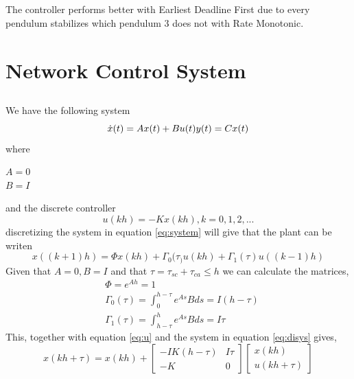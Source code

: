 \documentclass[12pt,a4paper]{article}
\begin{document}
\subsection{}
The controller performs better with Earliest Deadline First due to every
pendulum stabilizes which pendulum 3 does not with Rate Monotonic. 





\section{Network Control System}
\subsection{} %
We have the following system
  \begin{equation}
    \dot{x}(t) = Ax(t)+Bu(t) \\
    y(t) = Cx(t)
    \label{eq:system}
  \end{equation}
where
\begin{center}
$A=0$ \\
$B=I$
\end{center}
and the discrete controller
\begin{equation}
    u(kh) = -Kx(kh),    k = 0,1,2,...
    \label{eq:u}
\end{equation}
discretizing the system in equation \ref{eq:system} will give that the
plant can be writen
\begin{equation}
    x((k+1)h)=\Phi x(kh)+\Gamma_{0}(\tau_)u(kh)+\Gamma_{1}(\tau)u((k-1)h)
    \label{eq:disys}
\end{equation}
Given that $A=0, B=I$ and that $\tau = \tau_{sc}+\tau_{ca}\le h$ we can
calculate the matrices,
\begin{align*}
    &\Phi=e^{Ah}=1 \\
    &\Gamma_{0}(\tau)=\int_{0}^{h-\tau}e^{As}Bds=I(h-\tau) \\
    &\Gamma_{1}(\tau)=\int_{h-\tau}^{h}e^{As}Bds=I\tau
\end{align*}
This, together with equation \ref{eq:u} and the system in equation \ref{eq:disys}
gives,
\begin{equation}
  x(kh+\tau)=x(kh)+
  \begin{bmatrix}
    -IK(h-\tau) & I\tau\\
    -K & 0
  \end{bmatrix}
  \begin{bmatrix}
    x(kh) \\
    u(kh+\tau)
  \end{bmatrix}
\end{equation}
\end{document}
